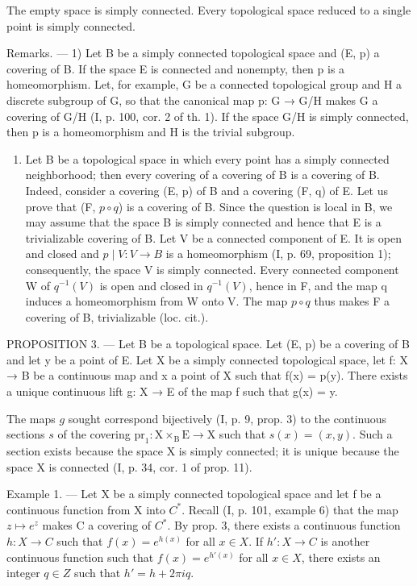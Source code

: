 The empty space is simply connected. Every topological space reduced to a single point is simply connected.

Remarks. --- 1) Let B be a simply connected topological space and (E, p) a covering of B. If the space E is connected and nonempty, then p is a homeomorphism. Let, for example, G be a connected topological group and H a discrete subgroup of G, so that the canonical map p: G → G/H makes G a covering of G/H (I, p. 100, cor. 2 of th. 1). If the space G/H is simply connected, then p is a homeomorphism and H is the trivial subgroup.

\begin{enumerate}
\def\labelenumi{\arabic{enumi})}
\setcounter{enumi}{1}
\tightlist
\item
  Let B be a topological space in which every point has a simply connected neighborhood; then every covering of a covering of B is a covering of B. Indeed, consider a covering (E, p) of B and a covering (F, q) of E. Let us prove that (F, \(p \circ q\)) is a covering of B. Since the question is local in B, we may assume that the space B is simply connected and hence that E is a trivializable covering of B. Let V be a connected component of E. It is open and closed and \(p \mid V: V \to B\) is a homeomorphism (I, p. 69, proposition 1); consequently, the space V is simply connected. Every connected component W of \(q^{-1}(V)\) is open and closed in \(q^{-1}(V)\), hence in F, and the map q induces a homeomorphism from W onto V. The map \(p \circ q\) thus makes F a covering of B, trivializable (loc. cit.).
\end{enumerate}

PROPOSITION 3. --- Let B be a topological space. Let (E, p) be a covering of B and let y be a point of E. Let X be a simply connected topological space, let f: X → B be a continuous map and x a point of X such that f(x) = p(y). There exists a unique continuous lift g: X → E of the map f such that g(x) = y.

The maps \(g\) sought correspond bijectively (I, p. 9, prop. 3) to the continuous sections \(s\) of the covering \(\mathrm{pr}_1: \mathrm{X} \times_{\mathrm{B}} \mathrm{E} \to \mathrm{X}\) such that \(s(x) = (x, y)\). Such a section exists because the space X is simply connected; it is unique because the space X is connected (I, p. 34, cor. 1 of prop. 11).

Example 1. --- Let X be a simply connected topological space and let f be a continuous function from X into \(C^{*}\). Recall (I, p. 101, example 6) that the map \(z \mapsto e^{z}\) makes C a covering of \(C^{*}\). By prop. 3, there exists a continuous function \(h: X \to C\) such that \(f(x) = e^{h(x)}\) for all \(x \in X\). If \(h': X \to C\) is another continuous function such that \(f(x) = e^{h'(x)}\) for all \(x \in X\), there exists an integer \(q \in Z\) such that \(h' = h + 2\pi iq\).

